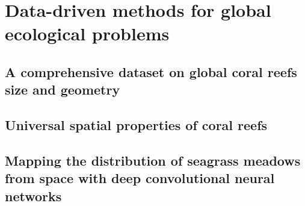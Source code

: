 \documentclass[
	10pt, %
	fleqn, %
	a4paper, %
]{LegrandOrangeBook}
\begin{document}

\part{Data-driven methods for global ecological problems}

\chapterspaceabove{6.75cm}
\chapterspacebelow{7.25cm}

\chapter{A comprehensive dataset on global coral reefs size and geometry}
%

\chapterspaceabove{6.75cm}
\chapterspacebelow{7.25cm}

\chapter{Universal spatial properties of coral reefs}
%

\chapterspaceabove{6.75cm}
\chapterspacebelow{7.25cm}

\chapter{Mapping the distribution of seagrass meadows from space with deep
  convolutional neural networks}
%
\end{document}
